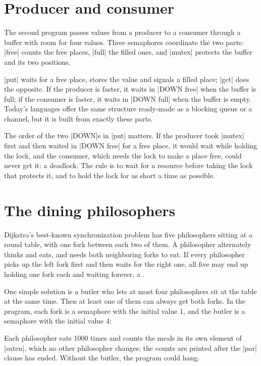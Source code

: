 \section{Producer and consumer}\label{sec-buffer}

The second program passes values from a producer to a consumer through a
buffer with room for four values. Three semaphores coordinate the two
parts: \code|free| counts the free places, \code|full| the filled ones,
and \code|mutex| protects the buffer and its two positions.


\code|put| waits for a free place, stores the value and signals a filled
place; \code|get| does the opposite. If the producer is faster, it waits
in \code|DOWN free| when the buffer is full; if the consumer is faster,
it waits in \code|DOWN full| when the buffer is empty. Today's languages
offer the same structure ready-made as a blocking queue or a channel, but
it is built from exactly these parts.

The order of the two \code|DOWN|s in \code|put| matters. If the producer
took \code|mutex| first and then waited in \code|DOWN free| for a free
place, it would wait while holding the lock, and the consumer, which
needs the lock to make a place free, could never get it: a deadlock. The
rule is to wait for a resource before taking the lock that protects it,
and to hold the lock for as short a time as possible.

\section{The dining philosophers}\label{sec-philosophers}

Dijkstra's best-known synchronization problem has five philosophers
sitting at a round table, with one fork between each two of them. A
philosopher alternately thinks and eats, and needs both neighboring forks
to eat. If every philosopher picks up the left fork first and then waits
for the right one, all five may end up holding one fork each and waiting
forever, a .

One simple solution is a butler who lets at most four philosophers sit
at the table at the same time. Then at least one of them can always get
both forks. In the program, each fork is a semaphore with the initial
value 1, and the butler is a semaphore with the initial value 4:


Each philosopher eats 1000 times and counts the meals in its own element
of \code|eaten|, which no other philosopher changes; the counts are
printed after the \code|par| clause has ended. Without the butler, the
program could hang.

